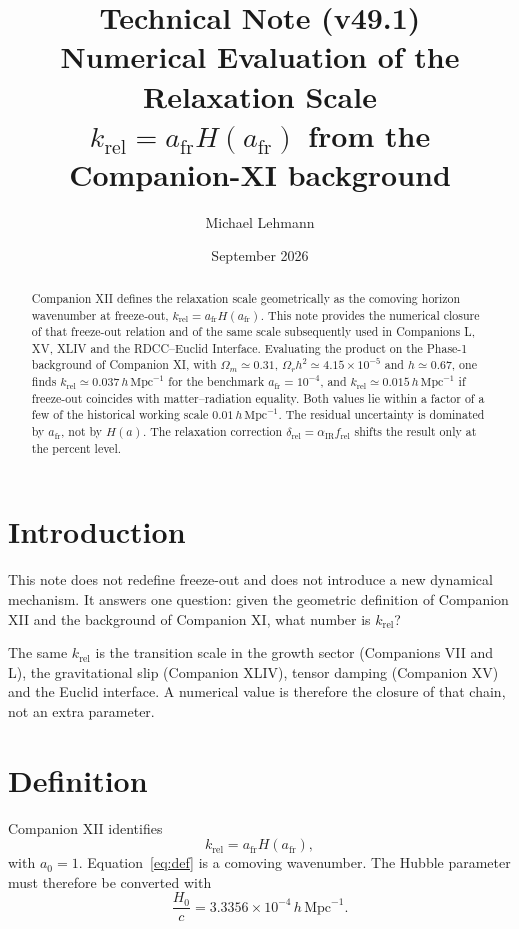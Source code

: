 \documentclass[11pt,a4paper]{article}
\title{\textbf{Technical Note (v49.1)}\\[0.2cm]
\textbf{Numerical Evaluation of the Relaxation Scale}\\[0.15cm]
\large \(k_{\mathrm{rel}}=a_{\mathrm{fr}}H(a_{\mathrm{fr}})\)
from the Companion-XI background}
\author[1]{Michael Lehmann}
\affil[1]{\small Independent Researcher, Relaxation-Driven Cyclic Cosmology (RDCC)\\
\texttt{mi.lehmann@gmx.de}}
\date{September 2026}
\begin{document}
\maketitle

\begin{abstract}
Companion XII defines the relaxation scale geometrically as the comoving
horizon wavenumber at freeze-out,
\(k_{\mathrm{rel}}=a_{\mathrm{fr}}H(a_{\mathrm{fr}})\). This note provides
the numerical closure of that freeze-out relation and of the same scale
subsequently used in Companions L, XV, XLIV and the RDCC--Euclid Interface.
Evaluating the product on the Phase-1 background of Companion XI, with
\(\Omega_m\simeq0.31\), \(\Omega_r h^2\simeq4.15\times10^{-5}\) and
\(h\simeq0.67\), one finds
\(k_{\mathrm{rel}}\simeq0.037\,h\,\mathrm{Mpc}^{-1}\) for the benchmark
\(a_{\mathrm{fr}}=10^{-4}\), and
\(k_{\mathrm{rel}}\simeq0.015\,h\,\mathrm{Mpc}^{-1}\) if freeze-out coincides
with matter--radiation equality. Both values lie within a factor of a few of
the historical working scale \(0.01\,h\,\mathrm{Mpc}^{-1}\). The residual
uncertainty is dominated by \(a_{\mathrm{fr}}\), not by \(H(a)\). The
relaxation correction \(\delta_{\mathrm{rel}}=\alpha_{\mathrm{IR}}f_{\mathrm{rel}}\)
shifts the result only at the percent level.
\end{abstract}

\tableofcontents
\newpage

\section{Introduction}

This note does not redefine freeze-out and does not introduce a new
dynamical mechanism. It answers one question: given the geometric
definition of Companion XII and the background of Companion XI, what
number is \(k_{\mathrm{rel}}\)?

The same \(k_{\mathrm{rel}}\) is the transition scale in the growth sector
(Companions VII and L), the gravitational slip (Companion XLIV), tensor
damping (Companion XV) and the Euclid interface. A numerical value is
therefore the closure of that chain, not an extra parameter.

\section{Definition}

Companion XII identifies
\begin{equation}
  k_{\mathrm{rel}}
  =
  a_{\mathrm{fr}} H(a_{\mathrm{fr}}),
  \label{eq:def}
\end{equation}
with \(a_0=1\). Equation~\eqref{eq:def} is a comoving wavenumber. The Hubble
parameter must therefore be converted with
\begin{equation}
  \frac{H_0}{c}
  =
  3.3356\times10^{-4}\, h\,\mathrm{Mpc}^{-1}.
\end{equation}
\end{document}

